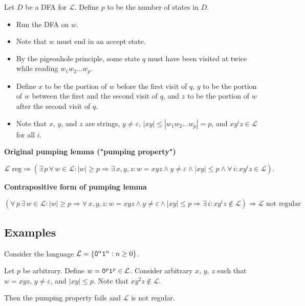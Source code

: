 \documentclass{notes}
\begin{document}
\begin{prf}
  Let $D$ be a DFA for $\mathcal L$.
  Define $p$ to be the number of states in $D$.
  \begin{itemize}
    \item Run the DFA on $w$.
      
    \item Note that $w$ must end in an accept state.
      
    \item By the pigeonhole principle, some state $q$ must have been visited at twice while reading $w_1 w_2 \dots w_p$.
      
    \item Define $x$ to be the portion of $w$ before the first visit of $q$, $y$ to be the portion of $w$ between the first and the second visit of $q$, and $z$ to be the portion of $w$ after the second visit of $q$.
      
    \item Note that $x$, $y$, and $z$ are strings, $y \neq \varepsilon$, $\left | x y \right | \leq \left | w_1 w_2 \dots w_p \right | = p$, and $x y^i z \in \mathcal L$ for all $i$.
  \end{itemize}
\end{prf}

{\boldmath \bfseries Original pumping lemma ("pumping property")}

\[
  \mathcal L \text{ reg} \Rightarrow (\exists \, p \, \forall \, w \in \mathcal L: \left | w \right | \geq p \Rightarrow \exists \, x, y, z: w = x y z \land y \neq \varepsilon \land \left | x y \right | \leq p \land \forall \, i: x y^i z \in \mathcal L).
\]

{\boldmath \bfseries Contrapositive form of pumping lemma}

\[
  (\forall \, p \, \exists \, w \in \mathcal L: \left | w \right | \geq p \Rightarrow \forall \, x, y, z: w = x y z \land y \neq \varepsilon \land \left | x y \right | \leq p \Rightarrow \exists \, i: x y^i z \not \in \mathcal L) \Rightarrow \mathcal L \text{ not regular}
\]

\newpage

\subsection{Examples}

\begin{eg}
  Consider the language $\mathcal L = \left \{ \verb~0~^n \verb~1~^n : n \geq 0 \right \}$.

  Let $p$ be arbitrary.
  Define $w = \verb~0~^p \verb~1~^p \in \mathcal L$.
  Consider arbitrary $x$, $y$, $z$ such that $w = x y z$, $y \neq \varepsilon$, and $\left | x y \right | \leq p$.
  Note that $x y^2 z \not \in \mathcal L$.
  
  Then the pumping property fails and $\mathcal L$ is not regular.
\end{eg}
\end{document}
